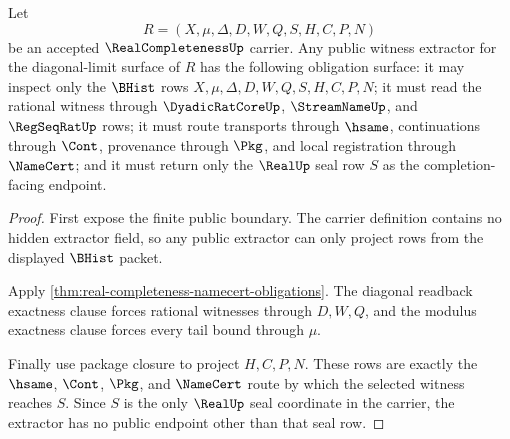 \begin{theorem}
\label{thm:real-completeness-witness-extractor-public-obligation}
Let
$$
R=(X,\mu,\Delta,D,W,Q,S,H,C,P,N)
$$
be an accepted $\RealCompletenessUp$ carrier. Any public witness extractor for the diagonal-limit surface of $R$ has the following obligation surface: it may inspect only the $\BHist$ rows $X,\mu,\Delta,D,W,Q,S,H,C,P,N$; it must read the rational witness through $\DyadicRatCoreUp$, $\StreamNameUp$, and $\RegSeqRatUp$ rows; it must route transports through $\hsame$, continuations through $\Cont$, provenance through $\Pkg$, and local registration through $\NameCert$; and it must return only the $\RealUp$ seal row $S$ as the completion-facing endpoint.
\end{theorem}
\begin{proof}
First expose the finite public boundary. The carrier definition contains no hidden extractor field, so any public extractor can only project rows from the displayed $\BHist$ packet.

Apply \autoref{thm:real-completeness-namecert-obligations}. The diagonal readback exactness clause forces rational witnesses through $D,W,Q$, and the modulus exactness clause forces every tail bound through $\mu$.

Finally use package closure to project $H,C,P,N$. These rows are exactly the $\hsame$, $\Cont$, $\Pkg$, and $\NameCert$ route by which the selected witness reaches $S$. Since $S$ is the only $\RealUp$ seal coordinate in the carrier, the extractor has no public endpoint other than that seal row.
\end{proof}

